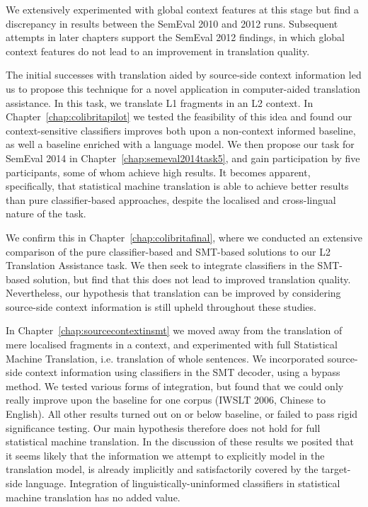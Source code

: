 We extensively experimented with global context features at this stage but find
a discrepancy in results between the SemEval 2010 and 2012 runs. Subsequent
attempts in later chapters support the SemEval 2012 findings, in which global
context features do not lead to an improvement in translation quality.

The initial successes with translation aided by source-side context information
led us to propose this technique for a novel application in computer-aided translation
assistance. In this task, we translate L1 fragments in an L2 context.
In Chapter~\ref{chap:colibritapilot} we tested the feasibility of this idea and
found our context-sensitive classifiers improves both upon a non-context informed
baseline, as well a baseline enriched with a language model. We then
propose our task for SemEval 2014 in Chapter~\ref{chap:semeval2014task5}, and gain
participation by five participants, some of whom achieve high results. It
becomes apparent, specifically, that statistical machine translation is able to
achieve better results than pure classifier-based approaches, despite the
localised and cross-lingual nature of the task.

We confirm this in Chapter~\ref{chap:colibritafinal}, where we conducted an
extensive comparison of the pure classifier-based and SMT-based solutions to
our L2 Translation Assistance task. We then seek to integrate classifiers in
the SMT-based solution, but find that this does not lead to improved
translation quality. Nevertheless, our hypothesis that translation can be
improved by considering source-side context information is still upheld
throughout these studies. 

In Chapter~\ref{chap:sourcecontextinsmt} we moved away from the translation of
mere localised fragments in a context, and experimented with full Statistical
Machine Translation, i.e. translation of whole sentences. We incorporated
source-side context information using classifiers in the SMT decoder, using a
bypass method. We tested various forms of integration, but found that we could
only really improve upon the baseline for one corpus (IWSLT 2006, Chinese to
English). All other results turned out on or below baseline, or failed to pass
rigid significance testing. Our main hypothesis therefore does not hold for
full statistical machine translation. In the discussion of these results we
posited that it seems likely that the information we attempt to explicitly
model in the translation model, is already implicitly and satisfactorily
covered by the target-side language. Integration of linguistically-uninformed
classifiers in statistical machine translation has no added value.











